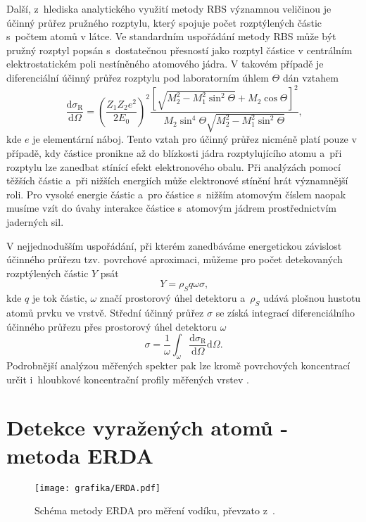 Další, z~hlediska analytického využití metody RBS významnou veličinou je účinný průřez pružného rozptylu, který spojuje počet rozptýlených částic s~počtem atomů v látce. Ve standardním uspořádání metody RBS může být pružný rozptyl popsán s~dostatečnou přesností jako rozptyl částice v centrálním elektrostatickém poli nestíněného atomového jádra. V takovém případě je diferenciální účinný průřez rozptylu pod laboratorním úhlem $\Theta$ dán vztahem
\begin{equation}
\frac{\mathrm{d}\sigma_\mathrm{R}}{\mathrm{d}\Omega} = 
\left( \frac{Z_1 Z_2 e^2}{2 E_0} \right)^2
 \frac{ \left[ \sqrt{M_2^2 - M_1^2\sin^2\Theta} + M_2 \cos\Theta \right]^2 }{M_2 \sin^4 \Theta \sqrt{M_2^2 - M_1^2\sin^2\Theta}}  \text{,}
\end{equation}
kde $e$ je elementární náboj. Tento vztah pro účinný průřez nicméně platí pouze v případě, kdy částice pronikne až do blízkosti jádra rozptylujícího atomu a~při rozptylu lze zanedbat stínící efekt elektronového obalu. Při analýzách pomocí těžších částic a~při nižších energiích může elektronové stínění hrát významnější roli. Pro vysoké energie částic a~pro částice s~nižším atomovým číslem naopak musíme vzít do úvahy interakce částice s~atomovým jádrem prostřednictvím jaderných sil.

V nejjednodušším uspořádání, při kterém zanedbáváme energetickou závislost účinného průřezu tzv. povrchové aproximaci, můžeme pro počet detekovaných rozptýlených částic $Y$ psát
\begin{equation}
Y = \rho_S q \omega \sigma \text{,}
\end{equation}
kde $q$ je tok částic, $\omega$ značí prostorový úhel detektoru a~$\rho_S$ udává plošnou hustotu atomů prvku ve vrstvě. Střední účinný průřez $\sigma$ se získá integrací diferenciálního účinného průřezu přes prostorový úhel detektoru $\omega$
\begin{equation}
\sigma = \frac{1}{\omega} \int_\omega \frac{\mathrm{d}\sigma_\mathrm{R}}{\mathrm{d}\Omega} \mathrm{d}\Omega \text{.}
\end{equation}
Podrobnější analýzou měřených spekter pak lze kromě povrchových koncentrací určit i~hloubkové koncentrační profily měřených vrstev \cite{Kral2002}. 




\section{Detekce vyražených atomů - metoda ERDA}
\begin{figure}[bthp]
  \centering
  \texttt{[image: grafika/ERDA.pdf]}
  \caption{Schéma metody ERDA pro měření vodíku, převzato z~\cite{Kral2002}.}
  \label{ERDA}
\end{figure}

